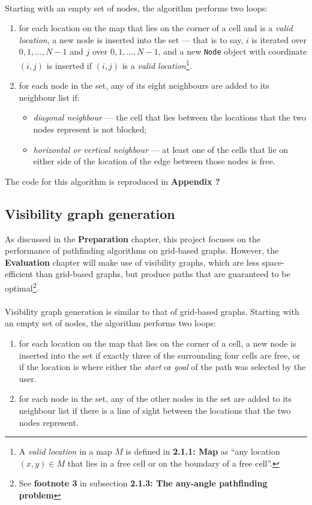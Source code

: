 \documentclass[12pt,notitlepage]{report}
\begin{document}
\\
\noindent
Starting with an empty set of nodes, the algorithm performs two loops:
\begin{enumerate}
\item for each location on the map that lies on the corner of a cell and is a {\em valid location}, a new node is inserted into the set  --- that is to say, $i$ is iterated over $0,1,\ldots,N-1$ and $j$ over $0,1,\ldots,N-1$, and a new {\tt Node} object with coordinate $(i,j)$ is inserted if $(i,j)$ is a {\em valid location}\footnote{A {\em valid location} in a map $M$ is defined in {\bfseries 2.1.1: Map} as ``any location $(x,y) \in M$ that lies in a free cell or on the boundary of a free cell''.}.
\item for each node in the set, any of its eight neighbours are added to its neighbour list if:
  \begin{itemize}
  \item {\em diagonal neighbour} --- the cell that lies between the locations that the two nodes represent is not blocked;
  \item {\em horizontal or vertical neighbour} --- at least one of the cells that lie on either side of the location of the edge between those nodes is free.
  \end{itemize}
\end{enumerate}
The code for this algorithm is reproduced in {\bfseries Appendix ?}

\subsection{Visibility graph generation}
As discussed in the {\bfseries Preparation} chapter, this project focuses on the performance of pathfinding algorithms on grid-based graphs. However, the {\bfseries Evaluation} chapter will make use of visibility graphs, which are less space-efficient than grid-based graphs, but produce paths that are guaranteed to be optimal\footnote{See {\bfseries footnote 3} in subsection {\bfseries 2.1.3: The any-angle pathfinding problem}}.\\

\\
\noindent
Visibility graph generation is similar to that of grid-based graphs. Starting with an empty set of nodes, the algorithm performs two loops:
\begin{enumerate}
\item for each location on the map that lies on the corner of a cell, a new node is inserted into the set if exactly three of the surrounding four cells are free, or if the location is where either the {\em start} or {\em goal} of the path was selected by the user.
\item for each node in the set, any of the other nodes in the set are added to its neighbour list if there is a line of sight between the locations that the two nodes represent.
\end{enumerate}
\end{document}
